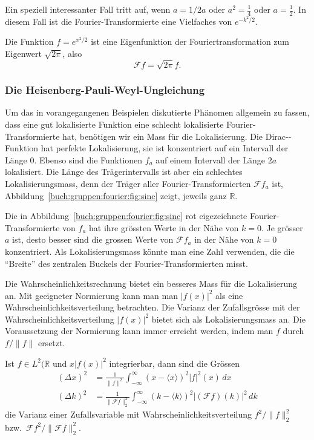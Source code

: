 Ein speziell interessanter Fall tritt auf, wenn $a=1/2a$ oder
$a^2=\frac14$ oder $a=\frac12$.
In diesem Fall ist die Fourier-Transformierte eine Vielfaches von
$e^{-k^2/2}$.

\begin{satz}
\label{buch:gruppen:fourier:satz:gausseigen}
Die Funktion $f=e^{x^2/2}$ ist eine Eigenfunktion der Fouriertransformation
zum Eigenwert $\!\sqrt{2\pi}$, also
\[
\mathscr{F}f = \!\sqrt{2\pi} f.
\]
\end{satz}

%
%
\subsubsection{Die Heisenberg-Pauli-Weyl-Ungleichung}
Um das in vorangegangenen Beispielen diskutierte Phänomen allgemein
zu fassen, dass eine gut lokalisierte Funktion eine schlecht lokalisierte
Fourier-Transformierte hat, benötigen wir ein Mass für die Lokalisierung.
Die Dirac-\textdelta-Funktion hat perfekte Lokalisierung, sie ist 
konzentriert auf ein Intervall der Länge $0$.
Ebenso sind die Funktionen $f_a$ auf einem Intervall der Länge $2a$
lokalisiert.
Die Länge des Trägerintervalls ist aber ein schlechtes Lokalisierungsmass,
denn der Träger aller Fourier-Transformierten $\mathscr{F}f_a$ ist,
Abbildung~\ref{buch:gruppen:fourier:fig:sinc} zeigt,
jeweils ganz $\mathbb{R}$.

Die in Abbildung~\ref{buch:gruppen:fourier:fig:sinc}
rot eigezeichnete Fourier-Transformierte von $f_a$ hat ihre grössten 
Werte in der Nähe von $k=0$.
Je grösser $a$ ist, desto besser sind die grossen Werte von $\mathscr{F}f_a$
in der Nähe von $k=0$ konzentriert.
Als Lokalisierungsmass könnte man eine Zahl verwenden, die die ``Breite''
des zentralen Buckels der Fourier-Transformierten misst.

Die Wahrscheinlichkeitsrechnung bietet ein besseres Mass für die
Lokalisierung an.
Mit geeigneter Normierung kann man man $|f(x)|^2$ als eine
Wahrscheinlichkeitsverteilung betrachten.
Die Varianz der Zufallsgrösse mit der Wahrscheinlichkeitsverteilung
$|f(x)|^2$ bietet sich als Lokalisierungsmass an.
Die Voraussetzung der Normierung kann immer erreicht werden, indem man
$f$ durch $f/\|f\|$ ersetzt.


\begin{definition}
Ist $f\in L^2(\mathbb{R}$ und $x|f(x)|^2$ integrierbar, dann sind
die Grössen
\begin{align*}
(\Delta x)^2
&=
\frac{1}{\|f\|^2}
\int_{-\infty}^\infty
(x-\langle x\rangle)^2
|f|^2(x)
\,dx
\\
(\Delta k)^2
&=
\frac{1}{\|\mathscr{F}f\|_2^2}
\int_{-\infty}^\infty
(k-\langle k\rangle)^2
|(\mathscr{F}f)(k)|^2
\,dk
\end{align*}
die Varianz einer Zufallsvariable mit Wahrscheinlichkeitsverteilung
$f^2/\|f\|_2^2$ bzw.~$\mathscr{F}f^2/\|\mathscr{F}f\|_2^2$.
\end{definition}

